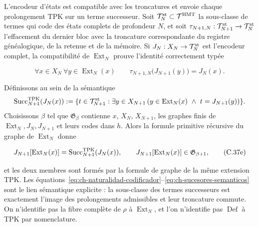 L’encodeur d’états est compatible avec les troncatures et envoie chaque
prolongement TPK sur un terme successeur. Soit
\(\mathcal T_N^{\rm st}\subset\mathcal T^{\rm HMT}\) la sous-classe de termes
qui code des états complets de profondeur \(N\), et soit
\(\tau_{N+1,N}:\mathcal T_{N+1}^{\rm st}\to\mathcal T_N^{\rm st}\) l’effacement
du dernier bloc avec la troncature correspondante du registre généalogique,
de la retenue et de la mémoire. Si \(J_N:X_N\to\mathcal T_N^{\rm st}\) est l’encodeur
complet, la compatibilité de \(\operatorname{Ext}_N\) prouve l’identité
correctement typée

\[
 \forall x\in X_N\ \forall y\in\operatorname{Ext}_N(x)\qquad
 \tau_{N+1,N}\bigl(J_{N+1}(y)\bigr)=J_N(x).
\tag{C.37e$_0$}\label{eq:ch-naturalidad-codificador}
\]

Définissons au sein de la sémantique
\[
 \operatorname{Succ}^{\rm TPK}_{N+1}(J_N(x)):=
 \{t\in\mathcal T_{N+1}^{\rm st}:\exists y\in X_{N+1}\,
   (y\in\operatorname{Ext}_N(x)\ \wedge\ t=J_{N+1}(y))\}.
\]
Choisissons \(\beta\) tel que \(\mathfrak G_\beta\) contienne \(x\), \(X_N\),
\(X_{N+1}\), les graphes finis de
\(\operatorname{Ext}_N,J_N,J_{N+1}\) et leurs codes dans \(h\). Alors la
formule primitive récursive du graphe de \(\operatorname{Ext}_N\) donne

\[
 J_{N+1}[\operatorname{Ext}_N(x)]
 =\operatorname{Succ}^{\rm TPK}_{N+1}(J_N(x)),
 \qquad
 J_{N+1}[\operatorname{Ext}_N(x)]
 \in\mathfrak G_{\beta+1},
\tag{C.37e}\label{eq:ch-sucesores-semanticos}
\]

et les deux membres sont formés par la formule de graphe de la même extension
TPK. Les équations~\eqref{eq:ch-naturalidad-codificador}--\eqref{eq:ch-sucesores-semanticos} sont le lien sémantique explicite : la
sous-classe des termes successeurs est exactement l’image des prolongements
admissibles et leur troncature commute. On n’identifie pas la fibre complète de
\(\rho\) à \(\operatorname{Ext}_N\), et l’on n’identifie pas
\(\operatorname{Def}\) à TPK par nomenclature.

